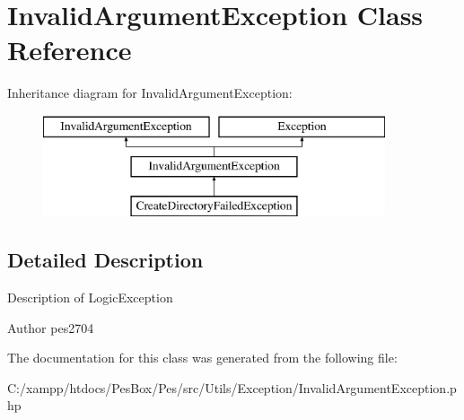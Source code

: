 \hypertarget{class_pes_1_1_utils_1_1_exception_1_1_invalid_argument_exception}{}\section{Invalid\+Argument\+Exception Class Reference}
\label{class_pes_1_1_utils_1_1_exception_1_1_invalid_argument_exception}
Inheritance diagram for Invalid\+Argument\+Exception\+:\begin{figure}[H]
\begin{center}
\leavevmode
\includegraphics[height=3.000000cm]{class_pes_1_1_utils_1_1_exception_1_1_invalid_argument_exception}
\end{center}
\end{figure}


\subsection{Detailed Description}
Description of Logic\+Exception

\begin{DoxyAuthor}{Author}
pes2704 
\end{DoxyAuthor}


The documentation for this class was generated from the following file\+:\begin{DoxyCompactItemize}
\item 
C\+:/xampp/htdocs/\+Pes\+Box/\+Pes/src/\+Utils/\+Exception/Invalid\+Argument\+Exception.\+php\end{DoxyCompactItemize}

